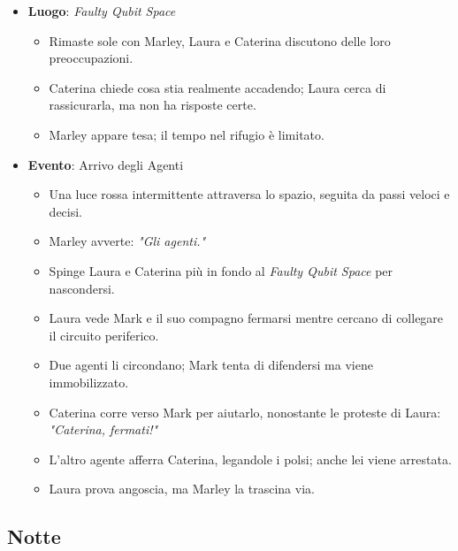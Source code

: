 \begin{itemize}
    \item \textbf{Luogo}: \emph{Faulty Qubit Space}
    \begin{itemize}
        \item Rimaste sole con Marley, Laura e Caterina discutono delle loro preoccupazioni.
        \item Caterina chiede cosa stia realmente accadendo; Laura cerca di rassicurarla, ma non ha risposte certe.
        \item Marley appare tesa; il tempo nel rifugio è limitato.
    \end{itemize}
    \item \textbf{Evento}: Arrivo degli Agenti
    \begin{itemize}
        \item Una luce rossa intermittente attraversa lo spazio, seguita da passi veloci e decisi.
        \item Marley avverte: \emph{"Gli agenti."}
        \item Spinge Laura e Caterina più in fondo al \emph{Faulty Qubit Space} per nascondersi.
        \item Laura vede Mark e il suo compagno fermarsi mentre cercano di collegare il circuito periferico.
        \item Due agenti li circondano; Mark tenta di difendersi ma viene immobilizzato.
        \item Caterina corre verso Mark per aiutarlo, nonostante le proteste di Laura: \emph{"Caterina, fermati!"}
        \item L'altro agente afferra Caterina, legandole i polsi; anche lei viene arrestata.
        \item Laura prova angoscia, ma Marley la trascina via.
    \end{itemize}
\end{itemize}

\subsection*{Notte}

